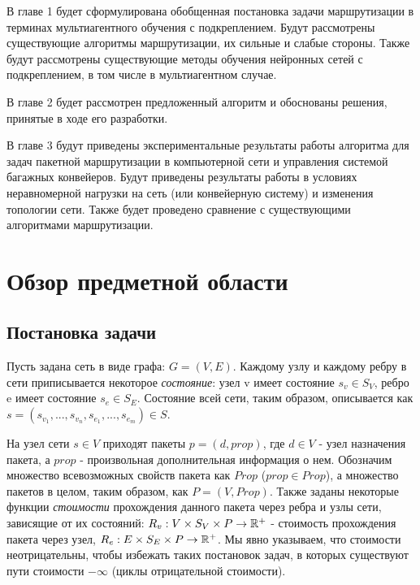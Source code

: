 \documentclass[specification, annotation]{itmo-student-thesis}
\begin{document}
В главе 1 будет сформулирована обобщенная постановка задачи маршрутизации в
терминах мультиагентного обучения с подкреплением. Будут рассмотрены
существующие алгоритмы маршрутизации, их сильные и слабые стороны. Также будут
рассмотрены существующие методы обучения нейронных сетей с подкреплением, в том
числе в мультиагентном случае.

В главе 2 будет рассмотрен предложенный алгоритм и обоснованы решения, принятые
в ходе его разработки.

В главе 3 будут приведены экспериментальные результаты работы алгоритма для
задач пакетной маршрутизации в компьютерной сети и управления системой багажных
конвейеров. Будут приведены результаты работы в условиях неравномерной
нагрузки на сеть (или конвейерную систему) и изменения топологии сети. Также
будет проведено сравнение с существующими алгоритмами маршрутизации.

\startrelatedwork

\chapter{Обзор предметной области}

\section{Постановка задачи}\label{task-setting}
Пусть задана сеть в виде графа: $G = (V, E)$. Каждому узлу и каждому ребру в сети
приписывается некоторое \textit{состояние}: узел v имеет состояние $s_v \in S_V$, ребро e
имеет состояние $s_e \in S_E$. Состояние всей сети, таким образом, описывается как
$s = (s_{v_1}, ... , s_{v_n}, s_{e_1}, ... , s_{e_m}) \in S$.

На узел сети $s \in V$ приходят пакеты $p = (d, prop)$, где $d \in V$ - узел
назначения пакета, а $prop$ - произвольная дополнительная информация о нем.
Обозначим множество всевозможных свойств пакета как $Prop$ ($prop \in Prop$), а
множество пакетов в целом, таким образом, как $P = (V, Prop)$. Также заданы
некоторые функции \textit{стоимости} прохождения данного пакета через ребра и
узлы сети, зависящие от их состояний:
$R_v : V \times S_V \times P \rightarrow \Bbb{R}^+$ - стоимость прохождения
пакета через узел, $R_e : E \times S_E \times P \rightarrow \Bbb{R}^+$. Мы явно
указываем, что стоимости неотрицательны, чтобы избежать таких постановок задач,
в которых существуют пути стоимости $-\infty$ (циклы отрицательной стоимости).
\end{document}
